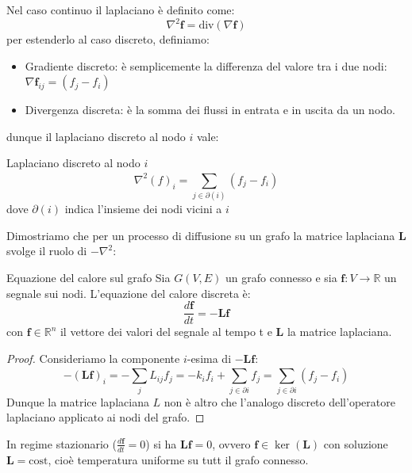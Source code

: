 Nel caso continuo il laplaciano è definito come:
\begin{equation}
    \nabla^2\mathbf{f}=\text{div}(\nabla \mathbf{f})
\end{equation}
per estenderlo al caso discreto, definiamo:
\begin{itemize}
    \item Gradiente discreto: è semplicemente la differenza del valore tra i due nodi: $\nabla \mathbf{f}_{ij}=(f_j-f_i)$
    \item Divergenza discreta: è la somma dei flussi in entrata e in uscita da un nodo.
\end{itemize}
dunque il laplaciano discreto al nodo $i$ vale:
\begin{boxb}{Laplaciano discreto al nodo $i$}
\begin{equation}
    \nabla^2(f)_i=\sum_{j \in \partial(i)}^{}(f_j-f_i)
\end{equation}
dove $\partial(i)$ indica l'insieme dei nodi vicini a $i$
\end{boxb}
Dimostriamo che per un processo di diffusione su un grafo la matrice laplaciana $\mathbf{L}$ svolge il ruolo di $-\nabla^2$:
\begin{boxb}{Equazione del calore sul grafo}
Sia $G(V,E)$ un grafo connesso e sia $\mathbf{f} : V \to \mathbb{R}$ un segnale sui nodi. L'equazione del calore discreta è:
\begin{equation}
    \frac{d\mathbf{f}}{dt}=-\mathbf{L}\mathbf{f}
    \label{diffusion_graph}
\end{equation}
con $\mathbf{f} \in \mathbb{R}^n$ il vettore dei valori del segnale al tempo t e $\mathbf{L}$ la matrice laplaciana.
\end{boxb}
\begin{proof}
Consideriamo la componente $i$-esima di $-\mathbf{L}\mathbf{f}$:
\begin{equation}
    -(\mathbf{L}\mathbf{f})_i=-\sum_{j}^{}L_{ij}f_j=-k_if_i +\sum_{j \in \partial{i}}^{}f_j=\sum_{j \in \partial{i}}^{}(f_j-f_i)
\end{equation}
Dunque la matrice laplaciana $L$ non è altro che l'analogo discreto dell'operatore laplaciano applicato ai nodi del grafo.
\end{proof}
In regime stazionario ($\frac{d\mathbf{f}}{dt}=0$) si ha $\mathbf{Lf}=0$, ovvero $\mathbf{f} \in \ker(\mathbf{L})$ con soluzione $\mathbf{L}=\text{cost}$, cioè temperatura uniforme su tutt il grafo connesso.\\

